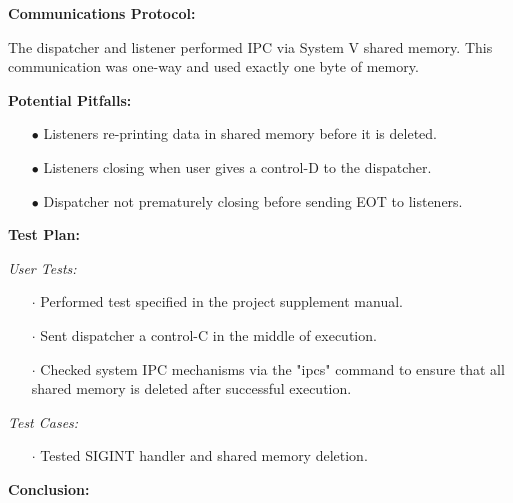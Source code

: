 \documentclass{article}
\begin{document}
\begin{flushleft}
\textbf{Communications Protocol:}
\vspace{.5pc}
\end{flushleft}

The dispatcher and listener performed IPC via System V shared memory. This 
communication was one-way and used exactly one byte of memory.  
\vspace{.5pc}

\begin{flushleft}
\textbf{Potential Pitfalls:}
\vspace{.5pc}
\end{flushleft}

\begin{itemize}
	\item[$\bullet$] Listeners re-printing data in shared memory before it is 
	deleted.
	\item[$\bullet$] Listeners closing when user gives a control-D to the 
	dispatcher.
	\item[$\bullet$] Dispatcher not prematurely closing before sending EOT to
	listeners. 
\end{itemize}
\vspace{.5pc}

\begin{flushleft}
\textbf{Test Plan:}
\vspace{.5pc}
\end{flushleft}

\textit{User Tests:}
\begin{itemize}
	\item[$\cdot$] Performed test specified in the project supplement manual.
	\item[$\cdot$] Sent dispatcher a control-C in the middle of execution.
	\item[$\cdot$] Checked system IPC mechanisms via the "ipcs" command to 
	ensure that all shared memory is deleted after successful execution.
\end{itemize}

\textit{Test Cases:}
\begin{itemize}
	\item[$\cdot$] Tested SIGINT handler and shared memory deletion.
	\end{itemize}
\vspace{.5pc}

\begin{flushleft}
\textbf{Conclusion:}
\vspace{.5pc}
\end{flushleft}
\end{document}
